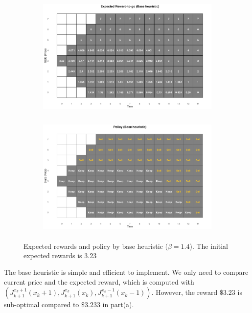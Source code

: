 \documentclass[11pt]{article}
\begin{document}
\begin{enumerate}[label=(\alph*)]
    \begin{figure}[h]
    \begin{subfigure}{0.5\textwidth}
    \includegraphics[width=0.9\linewidth, height=6cm]{media/hw2/partb1.png} 
    \label{fig:partb1}
    \end{subfigure}
    \begin{subfigure}{0.5\textwidth}
    \includegraphics[width=0.9\linewidth, height=6cm]{media/hw2/partb2.png}
    \label{fig:partb2}
    \end{subfigure}
    \caption{Expected rewards and policy by base heuristic ($\beta = 1.4$). The initial expected rewards is 3.23}
    \label{fig:partb}
    \end{figure}
    
    The base heuristic is simple and efficient to implement. We only need to compare current price and the expected reward, which is computed with $(J^{x_k + 1}_{k+1}(x_k+1), J^{x_k }_{k+1}(x_k), J^{x_k - 1}_{k+1}(x_k-1))$.
    However, the reward $\$3.23$ is sub-optimal compared to $\$3.233$ in part(a).
    

\end{enumerate}
\end{document}
